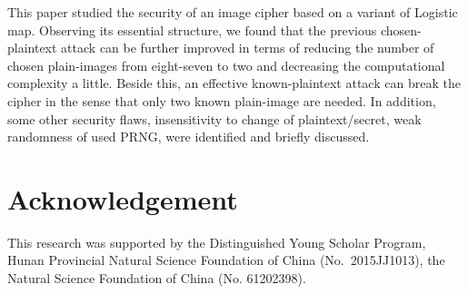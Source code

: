\documentclass{ws-ijbc}
\begin{document}
This paper studied the security of an image cipher
based on a variant of Logistic map. Observing its essential
structure, we found that the previous chosen-plaintext attack can be further improved in terms of reducing the number
of chosen plain-images from eight-seven to two and decreasing the computational complexity a little. Beside this,
an effective known-plaintext attack can break the cipher in the sense that only two known plain-image are needed. In addition, some other security flaws, insensitivity to change of plaintext/secret, weak randomness of used PRNG, were identified and briefly discussed.

\section*{Acknowledgement}

This research was supported by the Distinguished Young Scholar Program, Hunan Provincial Natural Science Foundation of China (No.~2015JJ1013), the Natural Science Foundation of China (No. 61202398).



\end{document}
